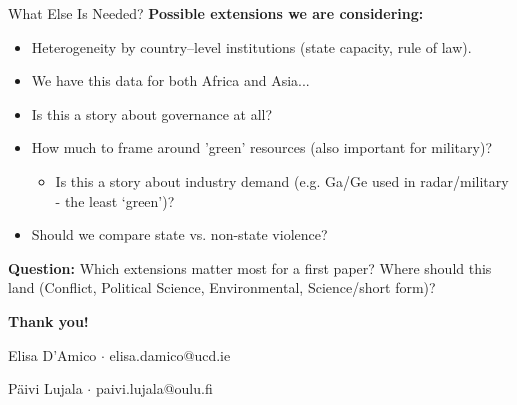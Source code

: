 \documentclass[aspectratio=169,11pt]{beamer}
\newcommand{\audience}[1]{%
  \vspace{0.5em}%
  {\color{lime}\textbf{Question:}} {\color{cream}#1}%
}
\begin{document}
\begin{frame}{What Else Is Needed?}
\textcolor{sage}{\textbf{Possible extensions we are considering:}}
\begin{itemize}
    \item Heterogeneity by country--level institutions (state capacity, rule of law).
    \item We have this data for both Africa and Asia...
    \item Is this a story about governance at all?
    \item How much to frame around 'green' resources (also important for military)?
           \begin{itemize}
             
           \item Is this a story about industry demand (e.g. Ga/Ge used in radar/military - the least `green')? 
\end{itemize} 
    \item Should we compare state vs. non-state violence?
\end{itemize}

\vspace{0.5em}
\audience{Which extensions matter most for a first paper? Where should this land (Conflict, Political Science, Environmental, Science/short form)?}
\end{frame}

\begin{frame}
\begin{center}
\vspace{2em}
{\Large\color{cream}\textbf{Thank you!}}

\vspace{1.5em}
{\normalsize\color{sage} Elisa D'Amico \quad $\cdot$ \quad elisa.damico@ucd.ie}

\vspace{0.3em}
{\normalsize\color{lime} P\"aivi Lujala \quad $\cdot$ \quad paivi.lujala@oulu.fi}
\end{center}
\end{frame}

\appendix
\end{document}
